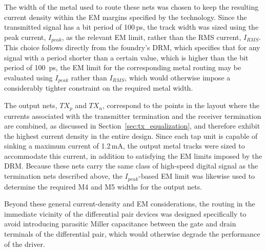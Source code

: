 The width of the metal used to route these nets was chosen to keep the resulting current density within the \ac{EM} margins specified by the technology. Since the transmitted signal has a bit period of 100\,ps, the track width was sized using the peak current, $I_{peak}$, as the relevant \ac{EM} limit, rather than the \ac{RMS} current, $I_{RMS}$. This choice follows directly from the foundry's \ac{DRM}, which specifies that for any signal with a period shorter than a certain value, which is higher than the bit period of \SI{100}{\pico\second}, the \ac{EM} limit for the corresponding metal routing may be evaluated using $I_{peak}$ rather than $I_{RMS}$, which would otherwise impose a considerably tighter constraint on the required metal width.

The output nets, $TX_p$ and $TX_n$, correspond to the points in the layout where the currents associated with the transmitter termination and the receiver termination are combined, as discussed in Section~\ref{sec:tx_equalization}, and therefore exhibit the highest current density in the entire design. Since each tap unit is capable of sinking a maximum current of 1.2\,mA, the output metal tracks were sized to accommodate this current, in addition to satisfying the \ac{EM} limits imposed by the \ac{DRM}. Because these nets carry the same class of high-speed digital signal as the termination nets described above, the $I_{peak}$-based \ac{EM} limit was likewise used to determine the required \ac{M4} and \ac{M5} widths for the output nets.

Beyond these general current-density and \ac{EM} considerations, the routing in the immediate vicinity of the differential pair devices was designed specifically to avoid introducing parasitic Miller capacitance between the gate and drain terminals of the differential pair, which would otherwise degrade the performance of the driver.





